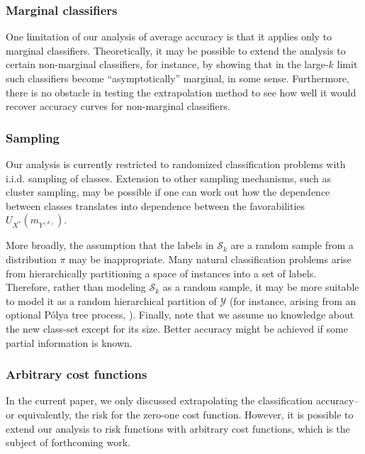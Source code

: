 \documentclass[twoside,11pt]{article}
\begin{document}
\subsubsection*{Marginal classifiers}
One limitation of our analysis of average accuracy is that it applies
only to marginal classifiers.  Theoretically, it may be possible to
extend the analysis to certain non-marginal classifiers, for instance,
by showing that in the large-$k$ limit such classifiers become
``asymptotically'' marginal, in some sense. Furthermore,  
there is no obstacle in testing the extrapolation method to
see how well it would recover accuracy curves for non-marginal classifiers. 

\subsubsection*{Sampling}
Our analysis is currently restricted to
randomized classification problems with i.i.d. sampling of classes.
Extension to other sampling mechanisms, such as cluster sampling, may
be possible if one can work out how the dependence between classes
translates into dependence between the favorabilities
$U_{X^*}(m_{Y^{(k)}})$. 

More broadly, the assumption that the labels in $\mathcal{S}_k$ are a
random sample from a distribution $\pi$ may be inappropriate.  Many
natural classification problems arise from hierarchically partitioning
a space of instances into a set of labels.  Therefore, rather than
modeling $\mathcal{S}_k$ as a random sample, it may be more suitable
to model it as a random hierarchical partition of $\mathcal{Y}$ (for
instance, arising from an optional P{\'o}lya tree process,
\cite{wong2010optional}).
Finally, note that we assume no knowledge about the new class-set
except for its size. Better accuracy might be achieved if some partial information 
is known.

\subsubsection*{Arbitrary cost functions}

In the current paper, we only discussed extrapolating the
classification accuracy--or equivalently, the risk for the zero-one
cost function.  However, it is possible to extend our analysis to risk
functions with arbitrary cost functions, which is the subject of
forthcoming work.
\end{document}
